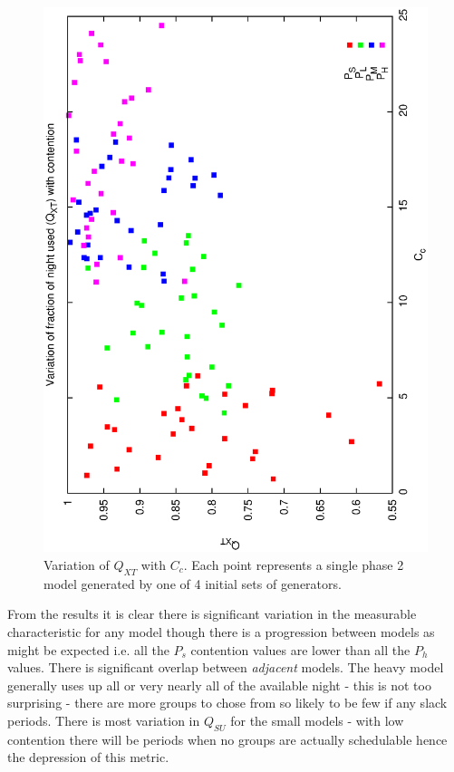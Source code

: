 \begin{figure}[h]
 \label{fig:p2_gen_xt}
\begin{center}
 \includegraphics[scale=0.5, angle=-90]{figures/p2_gen_qxt.eps}
 \caption[Variation of $Q_{XT}$ with $C_C$ for variable phase2 generator models.] 
   {Variation of $Q_{XT}$ with $C_c$. Each point represents a single phase 2 model generated by one of 4 initial sets of generators.}
\end{center}
\end{figure}

From the results it is clear there is significant variation in the measurable characteristic for any model though there is a progression between models as might be expected i.e. all the $P_s$ contention values are lower than all the $P_h$ values. There is significant overlap between \emph{adjacent} models. The heavy model generally uses up all or very nearly all of the available night - this is not too surprising - there are more groups to chose from so likely to be few if any slack periods. There is most variation in $Q_{SU}$ for the small models - with low contention there will be periods when no groups are actually schedulable hence the depression of this metric.


